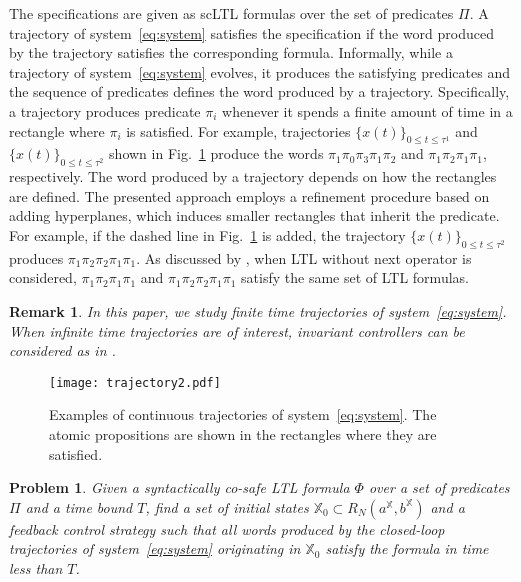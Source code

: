 \documentclass{ifacconf}
\newtheorem{remark}{Remark}
\newtheorem{problem}{Problem}
\newcommand{\RNset}{R_N(a^{\mathbb{X}},b^{\mathbb{X}})}
\newcommand{\XO}{\ensuremath{\mathbb{X}_0}}
\newcommand{\PREDSET}{\ensuremath{\Pi}}
\newcommand{\TIMEBOUND}{\ensuremath{T}}
\begin{document}
The specifications are given as scLTL formulas over the set of predicates $\PREDSET$. A trajectory of system~\eqref{eq:system} satisfies the specification if the word produced by the trajectory satisfies the corresponding formula. 
Informally, while a trajectory of system~\eqref{eq:system} evolves, it produces the satisfying predicates and the sequence of predicates defines the word produced by a trajectory. Specifically, a trajectory produces predicate $\pi_i$ whenever it spends a finite amount of time in a rectangle where $\pi_i$ is satisfied. 
For example, trajectories $\{x(t)\}_{0\leq t \leq \tau^1}$ and $\{x(t)\}_{0\leq t \leq \tau^2}$ shown in Fig.~\ref{fig:trajectory} produce the words $\pi_1\pi_0\pi_3\pi_1\pi_2$ and $\pi_1\pi_2\pi_1\pi_1$, respectively. 
The word produced by a trajectory depends on how the rectangles are defined. The presented approach employs a refinement procedure based on adding hyperplanes, which induces smaller rectangles that inherit the predicate.
For example, if the dashed line in Fig.~\ref{fig:trajectory} is added, the trajectory $\{x(t)\}_{0\leq t \leq \tau^2}$ produces $\pi_1\pi_2\pi_2\pi_1\pi_1$.
As discussed by \cite{Kloetzer:2008}, when LTL without next operator is considered,   $\pi_1\pi_2\pi_1\pi_1$ and $\pi_1\pi_2\pi_2\pi_1\pi_1$ satisfy the same set of LTL formulas.
\begin{remark}
In this paper, we study finite time trajectories of system~\eqref{eq:system}. 
When infinite time trajectories are of interest, invariant controllers can be considered as in \cite{Habets2006}.
\end{remark}
  \begin{figure}
\centering
\texttt{[image: trajectory2.pdf]}
\caption{Examples of continuous trajectories of system~\eqref{eq:system}. The atomic propositions are shown in the rectangles where they are satisfied.}
\label{fig:trajectory}
\end{figure}



\begin{problem}\label{prob:main}
Given a syntactically co-safe LTL formula $\Phi$ over a set of predicates $\PREDSET$ and a time bound \TIMEBOUND,  find a set of initial states $\XO \subset \RNset$ 
and a feedback control strategy such that all words produced by the closed-loop trajectories of system~\eqref{eq:system} originating in $\XO$ satisfy the formula in time less than \TIMEBOUND.
\end{problem}
\end{document}

